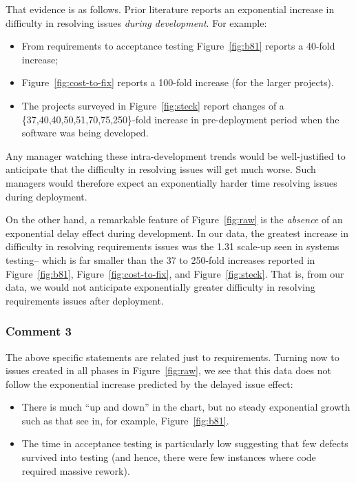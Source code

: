 \documentclass[smallcondesed]{svjour3}
\newcommand{\bi}{\begin{itemize}}%
\newcommand{\ei}{\end{itemize}}
\newcommand{\fig}[1]{Figure~\ref{fig:#1}}
\begin{document}
That evidence is as follows.
Prior literature reports an  exponential increase in difficulty in resolving issues {\em during
development}.
For example:
\bi
\item  From requirements to acceptance testing
\fig{b81} reports a 40-fold increase;
\item
 \fig{cost-to-fix} reports a 100-fold increase
(for the larger projects).
\item
The projects surveyed in \fig{steck} report changes of a  \newline
\{37,40,40,50,51,70,75,250\}-fold increase in pre-deployment period when the software was being developed.
\ei
Any manager watching  these intra-development trends would be well-justified
to anticipate that  the difficulty in resolving issues  will get much worse. Such managers
would therefore expect an exponentially harder time resolving issues during deployment.

On the other hand, a remarkable feature of Figure~\ref{fig:raw} is the {\em absence}
of an exponential delay effect during development.
In our data, the greatest increase in difficulty in resolving requirements issues was the 1.31 scale-up seen in systems testing--
which is far smaller than the 37 to 250-fold increases reported in \fig{b81}, \fig{cost-to-fix},
and \fig{steck}.  That is, from our  data, we would not anticipate exponentially greater difficulty in resolving requirements issues after
deployment. 
 \subsubsection{Comment 3}
 The above specific statements are related just to requirements. Turning now
 to issues created in all phases in Figure~\ref{fig:raw},  we see that
 this data does not follow the exponential increase predicted
by the delayed issue effect:
\bi
\item There is much ``up and down'' in the chart, but no steady exponential growth such
as that see in, for example,  \fig{b81}.
\item The time in acceptance  testing is particularly low suggesting that few defects survived into testing
(and hence, there were few instances where code required massive rework).
\ei
 
\end{document}
